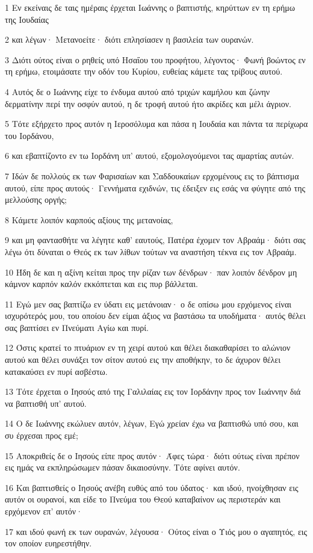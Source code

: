 \par 1 Εν εκείναις δε ταις ημέραις έρχεται Ιωάννης ο βαπτιστής, κηρύττων εν τη ερήμω της Ιουδαίας
\par 2 και λέγων· Μετανοείτε· διότι επλησίασεν η βασιλεία των ουρανών.
\par 3 Διότι ούτος είναι ο ρηθείς υπό Ησαΐου του προφήτου, λέγοντος· Φωνή βοώντος εν τη ερήμω, ετοιμάσατε την οδόν του Κυρίου, ευθείας κάμετε τας τρίβους αυτού.
\par 4 Αυτός δε ο Ιωάννης είχε το ένδυμα αυτού από τριχών καμήλου και ζώνην δερματίνην περί την οσφύν αυτού, η δε τροφή αυτού ήτο ακρίδες και μέλι άγριον.
\par 5 Τότε εξήρχετο προς αυτόν η Ιεροσόλυμα και πάσα η Ιουδαία και πάντα τα περίχωρα του Ιορδάνου,
\par 6 και εβαπτίζοντο εν τω Ιορδάνη υπ' αυτού, εξομολογούμενοι τας αμαρτίας αυτών.
\par 7 Ιδών δε πολλούς εκ των Φαρισαίων και Σαδδουκαίων ερχομένους εις το βάπτισμα αυτού, είπε προς αυτούς· Γεννήματα εχιδνών, τις έδειξεν εις εσάς να φύγητε από της μελλούσης οργής;
\par 8 Κάμετε λοιπόν καρπούς αξίους της μετανοίας,
\par 9 και μη φαντασθήτε να λέγητε καθ' εαυτούς, Πατέρα έχομεν τον Αβραάμ· διότι σας λέγω ότι δύναται ο Θεός εκ των λίθων τούτων να αναστήση τέκνα εις τον Αβραάμ.
\par 10 Ήδη δε και η αξίνη κείται προς την ρίζαν των δένδρων· παν λοιπόν δένδρον μη κάμνον καρπόν καλόν εκκόπτεται και εις πυρ βάλλεται.
\par 11 Εγώ μεν σας βαπτίζω εν ύδατι εις μετάνοιαν· ο δε οπίσω μου ερχόμενος είναι ισχυρότερός μου, του οποίου δεν είμαι άξιος να βαστάσω τα υποδήματα· αυτός θέλει σας βαπτίσει εν Πνεύματι Αγίω και πυρί.
\par 12 Όστις κρατεί το πτυάριον εν τη χειρί αυτού και θέλει διακαθαρίσει το αλώνιον αυτού και θέλει συνάξει τον σίτον αυτού εις την αποθήκην, το δε άχυρον θέλει κατακαύσει εν πυρί ασβέστω.
\par 13 Τότε έρχεται ο Ιησούς από της Γαλιλαίας εις τον Ιορδάνην προς τον Ιωάννην διά να βαπτισθή υπ' αυτού.
\par 14 Ο δε Ιωάννης εκώλυεν αυτόν, λέγων, Εγώ χρείαν έχω να βαπτισθώ υπό σου, και συ έρχεσαι προς εμέ;
\par 15 Αποκριθείς δε ο Ιησούς είπε προς αυτόν· Άφες τώρα· διότι ούτως είναι πρέπον εις ημάς να εκπληρώσωμεν πάσαν δικαιοσύνην. Τότε αφίνει αυτόν.
\par 16 Και βαπτισθείς ο Ιησούς ανέβη ευθύς από του ύδατος· και ιδού, ηνοίχθησαν εις αυτόν οι ουρανοί, και είδε το Πνεύμα του Θεού καταβαίνον ως περιστεράν και ερχόμενον επ' αυτόν·
\par 17 και ιδού φωνή εκ των ουρανών, λέγουσα· Ούτος είναι ο Υιός μου ο αγαπητός, εις τον οποίον ευηρεστήθην.

